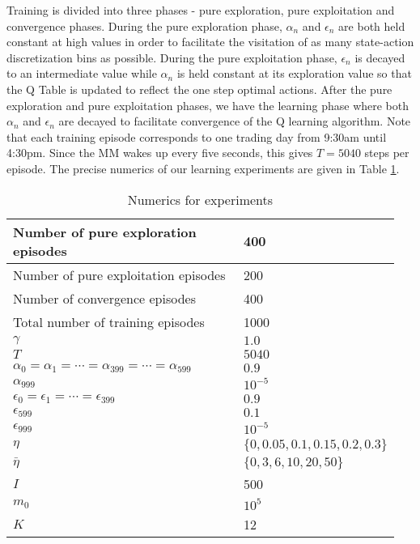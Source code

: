 \documentclass[sigconf]{acmart}
\begin{document}
Training is divided into three phases - pure exploration, pure exploitation and convergence phases. During the pure exploration phase, $\alpha_n$ and $\epsilon_n$ are both held constant at high values in order to facilitate the visitation of as many state-action discretization bins as possible. During the pure exploitation phase, $\epsilon_n$ is decayed to an intermediate value while $\alpha_n$ is held constant at its exploration value so that the Q Table is updated to reflect the one step optimal actions. After the pure exploration and pure exploitation phases, we have the learning phase where both $\alpha_n$ and $\epsilon_n$ are decayed to facilitate convergence of the Q learning algorithm. Note that each training episode corresponds to one trading day from 9:30am until 4:30pm. Since the MM wakes up every five seconds, this gives $T=5040$ steps per episode. The precise numerics of our learning experiments are given in Table \ref{tab:expt_numerics}. 

\begin{table}
    \centering
    \begin{tabular}{|p{0.6\linewidth}|p{0.35\linewidth}|}\hline
        Number of pure exploration episodes & 400 \\\hline
        Number of pure exploitation episodes & 200 \\\hline
        Number of convergence episodes & 400 \\\hline
        Total number of training episodes & 1000\\\hline
        $\gamma$ & $1.0$\\\hline
        $T$ & $5040$\\\hline
        $\alpha_0=\alpha_1=\cdots=\alpha_{399}=\cdots=\alpha_{599}$  & $0.9$\\\hline
        $\alpha_{999}$ & $10^{-5}$\\\hline
        $\epsilon_0=\epsilon_1=\cdots=\epsilon_{399}$ & $0.9$\\\hline
        $\epsilon_{599}$ & $0.1$ \\\hline
        $\epsilon_{999}$ & $10^{-5}$\\\hline
        $\eta$ & $\lbrace0,0.05,0.1,0.15,0.2,0.3\rbrace$\\\hline
        $\bar\eta$ & $\lbrace0,3,6,10,20,50\rbrace$\\\hline
        $I$ & 500\\\hline
        $m_0$ & $10^5$\\\hline
        $K$ & 12\\\hline
    \end{tabular}
    \caption{Numerics for experiments}
    \label{tab:expt_numerics}
\end{table}
\end{document}
